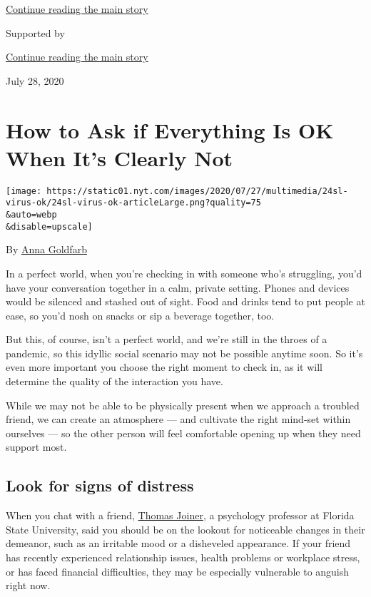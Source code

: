 \protect\hyperlink{after-top}{Continue reading the main story}

Supported by

\protect\hyperlink{after-sponsor}{Continue reading the main story}

July 28, 2020

\hypertarget{how-to-ask-if-everything-is-ok-when-its-clearly-not}{%
\section{How to Ask if Everything Is OK When It's Clearly
Not}\label{how-to-ask-if-everything-is-ok-when-its-clearly-not}}

\texttt{[image: https://static01.nyt.com/images/2020/07/27/multimedia/24sl-virus-ok/24sl-virus-ok-articleLarge.png?quality=75\\\&auto=webp\\\&disable=upscale]}

By \href{https://www.nytimes.com/by/anna-goldfarb}{Anna Goldfarb}

In a perfect world, when you're checking in with someone who's
struggling, you'd have your conversation together in a calm, private
setting. Phones and devices would be silenced and stashed out of sight.
Food and drinks tend to put people at ease, so you'd nosh on snacks or
sip a beverage together, too.

But this, of course, isn't a perfect world, and we're still in the
throes of a pandemic, so this idyllic social scenario may not be
possible anytime soon. So it's even more important you choose the right
moment to check in, as it will determine the quality of the interaction
you have.

While we may not be able to be physically present when we approach a
troubled friend, we can create an atmosphere --- and cultivate the right
mind-set within ourselves --- so the other person will feel comfortable
opening up when they need support most.

\hypertarget{look-for-signs-of-distress}{%
\subsection{Look for signs of
distress}\label{look-for-signs-of-distress}}

When you chat with a friend,
\href{https://psy.fsu.edu/faculty/joinert/joiner.dp.php}{Thomas Joiner},
a psychology professor at Florida State University, said you should be
on the lookout for noticeable changes in their demeanor, such as an
irritable mood or a disheveled appearance. If your friend has recently
experienced relationship issues, health problems or workplace stress, or
has faced financial difficulties, they may be especially vulnerable to
anguish right now.

